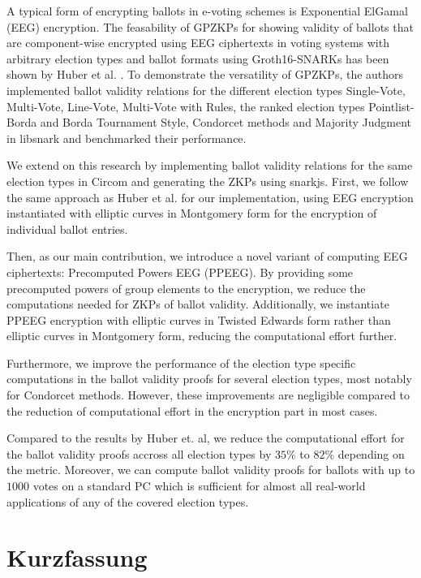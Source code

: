 \documentclass[
  a4paper,  %
  twoside,  %
  bibliography=totoc,
  headsepline,
  cleardoublepage=empty,
  parskip=half,
  draft=false
]{scrbook}
\begin{document}
A typical form of encrypting ballots in e-voting schemes is Exponential ElGamal (EEG) encryption.
The feasability of GPZKPs for showing validity of ballots that are component-wise encrypted using EEG ciphertexts in voting systems with arbitrary election types and ballot formats using Groth16-SNARKs \cite{groth_size_2016} has been shown by Huber et al. \cite{huber_zk-snarks_2025}.
To demonstrate the versatility of GPZKPs, the authors implemented ballot validity relations for the different election types Single-Vote, Multi-Vote, Line-Vote, Multi-Vote with Rules, the ranked election types Pointlist-Borda and Borda Tournament Style, Condorcet methods and Majority Judgment in libsnark and benchmarked their performance.

We extend on this research by implementing ballot validity relations for the same election types in Circom and generating the ZKPs using snarkjs.
First, we follow the same approach as Huber et al. for our implementation, using EEG encryption instantiated with elliptic curves in Montgomery form for the encryption of individual ballot entries.

Then, as our main contribution, we introduce a novel variant of computing EEG ciphertexts: Precomputed Powers EEG (PPEEG). 
By providing some precomputed powers of group elements to the encryption, we reduce the computations needed for ZKPs of ballot validity.
Additionally, we instantiate PPEEG encryption with elliptic curves in Twisted Edwards form rather than elliptic curves in Montgomery form, reducing the computational effort further.

Furthermore, we improve the performance of the election type specific computations in the ballot validity proofs for several election types, most notably for Condorcet methods.
However, these improvements are negligible compared to the reduction of computational effort in the encryption part in most cases.

Compared to the results by Huber et. al, we reduce the computational effort for the ballot validity proofs accross all election types by $35\%$ to $82\%$ depending on the metric.
Moreover, we can compute ballot validity proofs for ballots with up to $1000$ votes on a standard PC which is sufficient for almost all real-world applications of any of the covered election types.

\cleardoublepage

\section*{Kurzfassung}
\end{document}
